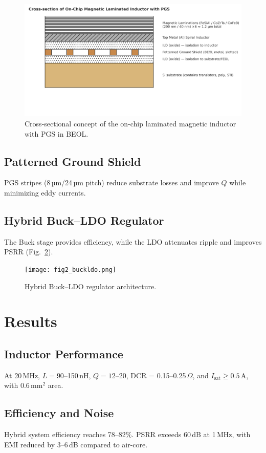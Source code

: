 \documentclass[journal]{IEEEtran}
\begin{document}
\begin{figure}[t]
  \centering
  \includegraphics[width=\textwidth]{fig1_laminated_cross_section.png}
  \caption{Cross-sectional concept of the on-chip laminated magnetic inductor with PGS in BEOL.}
  \label{fig:cross_section}
\end{figure}

\subsection{Patterned Ground Shield}
PGS stripes (8\,µm/24\,µm pitch) reduce substrate losses and improve $Q$ while minimizing eddy currents.

\subsection{Hybrid Buck--LDO Regulator}
The Buck stage provides efficiency, while the LDO attenuates ripple and improves PSRR (Fig.~\ref{fig:buckldo}).

\begin{figure}[t]
  \centering
  \texttt{[image: fig2\_buckldo.png]}
  \caption{Hybrid Buck--LDO regulator architecture.}
  \label{fig:buckldo}
\end{figure}

\section{Results}
\subsection{Inductor Performance}
At 20\,MHz, $L=90$--150\,nH, $Q=12$--20, DCR = 0.15--0.25\,$\Omega$, and $I_\text{sat}\geq 0.5$\,A, with 0.6\,mm$^2$ area.

\subsection{Efficiency and Noise}
Hybrid system efficiency reaches 78--82\%. PSRR exceeds 60\,dB at 1\,MHz, with EMI reduced by 3--6\,dB compared to air-core.
\end{document}
